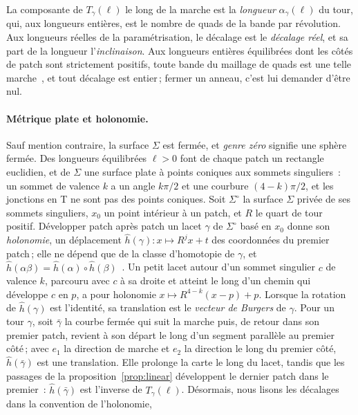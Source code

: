 \documentclass[11pt,a4paper]{article}
\begin{document}
La composante de $T_\gamma(\ell)$ le long de la marche est la \emph{longueur}
$\alpha_\gamma(\ell)$ du tour, qui, aux longueurs entières, est le nombre de
quads de la bande par révolution. Aux longueurs réelles de la paramétrisation,
le décalage est le \emph{décalage réel}, et sa part de la longueur
l'\emph{inclinaison}. Aux longueurs entières équilibrées dont les côtés de
patch sont strictement positifs, toute bande du maillage de quads est une
telle marche~\cite[prop.~2]{gardent2026loops}, et tout décalage est
entier\,; fermer un anneau, c'est lui demander d'être nul.

\paragraph{Métrique plate et holonomie.}
Sauf mention contraire, la surface $\Sigma$ est fermée, et \emph{genre zéro}
signifie une sphère fermée. Des longueurs équilibrées $\ell > 0$ font de
chaque patch un rectangle euclidien, et de $\Sigma$ une surface plate à points
coniques aux sommets singuliers~: un sommet de valence $k$ a un angle
$k\pi/2$ et une courbure $(4-k)\pi/2$, et les jonctions en T ne sont pas des
points coniques. Soit $\Sigma^\circ$ la surface $\Sigma$ privée de ses
sommets singuliers, $x_0$ un point intérieur à un patch, et $R$ le quart de
tour positif. Développer patch après patch un lacet $\gamma$ de $\Sigma^\circ$
basé en $x_0$ donne son \emph{holonomie}, un déplacement $\hat
h(\gamma)\colon x \mapsto R^j x + t$ des coordonnées du premier patch\,; elle
ne dépend que de la classe d'homotopie de $\gamma$, et $\hat h(\alpha\beta) =
\hat h(\alpha) \circ \hat h(\beta)$~\cite{izmestiev2013torus}. Un petit lacet
autour d'un sommet singulier $c$ de valence $k$, parcouru avec $c$ à sa
droite et atteint le long d'un chemin qui développe $c$ en $p$, a pour
holonomie $x \mapsto R^{4-k}(x - p) + p$. Lorsque la rotation de $\hat
h(\gamma)$ est l'identité, sa translation est le \emph{vecteur de Burgers} de
$\gamma$. Pour un tour $\gamma$, soit $\bar\gamma$ la courbe fermée qui suit
la marche puis, de retour dans son premier patch, revient à son départ le long
d'un segment parallèle au premier côté\,; avec $e_1$ la direction de marche
et $e_2$ la direction le long du premier côté, $\hat h(\bar\gamma)$ est une
translation. Elle prolonge la carte le long du lacet, tandis que les passages
de la proposition~\ref{prop:linear} développent le dernier patch dans le
premier~: $\hat h(\bar\gamma)$ est l'inverse de $T_\gamma(\ell)$. Désormais,
nous lisons les décalages dans la convention de l'holonomie,
\end{document}

